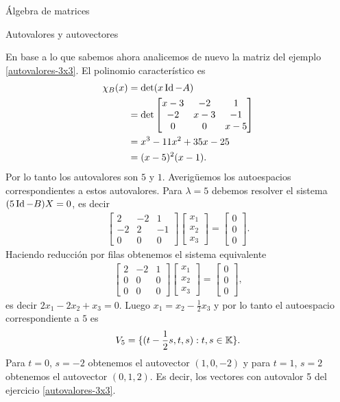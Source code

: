 \begin{chapter}{\'Algebra de matrices}
\begin{section}{Autovalores y autovectores}
        \begin{ejemplo*}
            En  base a lo que sabemos ahora analicemos de nuevo  la matriz del ejemplo \ref{autovalores-3x3}. El polinomio característico es 
            \begin{align*}
            \chi_B(x)&=\det(x \operatorname{Id}-A)\\
            &=\det\begin{bmatrix}x-3&-2&{ 1}\\-2&x-3&-1\\0&0&x-5\end{bmatrix}\\
            &= x^3- 11 x^2+ 35 x-25 \\
            &=(x-5)^2(x-1).
            \end{align*}
        Por lo tanto los autovalores son $5$ y $1$. Averigüemos los autoespacios correspondientes a estos autovalores. Para $\lambda=5$ debemos resolver el sistema $(5\operatorname{Id}-B)X=0$, es decir
        \begin{align*}
        \begin{bmatrix}2&-2&{ 1}\\-2&2&-1\\0&0&0\end{bmatrix}
        \begin{bmatrix}x_1\\x_2\\x_3\end{bmatrix}
        =
        \begin{bmatrix}0\\0\\0\end{bmatrix}.
        \end{align*}
        Haciendo reducción por filas obtenemos el sistema equivalente
        \begin{align*}
        \begin{bmatrix}2&-2&{ 1}\\0&0&0\\0&0&0\end{bmatrix}
        \begin{bmatrix}x_1\\x_2\\x_3\end{bmatrix}
        =
        \begin{bmatrix}0\\0\\0\end{bmatrix},
        \end{align*}
        es decir $2x_1-2x_2+x_3=0$. Luego $x_1=x_2-\frac{1}{2}x_3$ y por lo tanto el autoespacio correspondiente a $5$ es  
        \begin{align*}
        V_5=\{(t-\frac{1}{2}s,t,s): t,s\in\mathbb K\}. 
        \end{align*}
        Para $t=0$, $s=-2$ obtenemos el autovector $(1,0,-2)$ y para $t=1$, $s=2$ obtenemos el autovector $(0, 1,2)$. Es decir,  los vectores con autovalor 5 del ejercicio  \ref{autovalores-3x3}. 


\end{ejemplo*}
\end{section}
\end{chapter}
